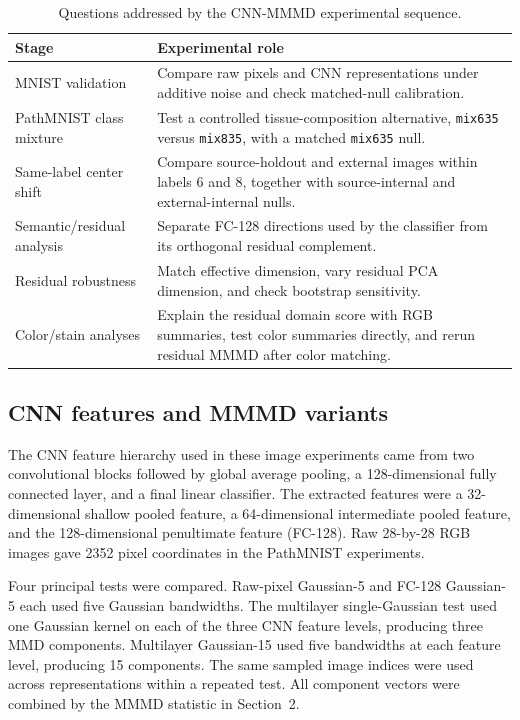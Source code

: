 \documentclass[12pt]{article}
\begin{document}
\begin{table}[H]
\centering
\caption{Questions addressed by the CNN-MMMD experimental sequence.}
\label{tab:app-dechao-ledger}
\footnotesize
\renewcommand{\arraystretch}{0.92}
\setlength{\tabcolsep}{3pt}
\begin{tabular}{>{\raggedright\arraybackslash}p{}>{\raggedright\arraybackslash}p{}}
\toprule
Stage & Experimental role \\
\midrule
MNIST validation & Compare raw pixels and CNN representations under additive noise and check matched-null calibration. \\
PathMNIST class mixture & Test a controlled tissue-composition alternative, \texttt{mix635} versus \texttt{mix835}, with a matched \texttt{mix635} null. \\
Same-label center shift & Compare source-holdout and external images within labels 6 and 8, together with source-internal and external-internal nulls. \\
Semantic/residual analysis & Separate FC-128 directions used by the classifier from its orthogonal residual complement. \\
Residual robustness & Match effective dimension, vary residual PCA dimension, and check bootstrap sensitivity. \\
Color/stain analyses & Explain the residual domain score with RGB summaries, test color summaries directly, and rerun residual MMMD after color matching. \\
\bottomrule
\end{tabular}
\end{table}

\subsection{CNN features and MMMD variants}

The CNN feature hierarchy used in these image experiments came from two convolutional blocks followed by global average pooling, a 128-dimensional fully connected layer, and a final linear classifier. The extracted features were a 32-dimensional shallow pooled feature, a 64-dimensional intermediate pooled feature, and the 128-dimensional penultimate feature (FC-128). Raw 28-by-28 RGB images gave 2352 pixel coordinates in the PathMNIST experiments.

Four principal tests were compared. Raw-pixel Gaussian-5 and FC-128 Gaussian-5 each used five Gaussian bandwidths. The multilayer single-Gaussian test used one Gaussian kernel on each of the three CNN feature levels, producing three MMD components. Multilayer Gaussian-15 used five bandwidths at each feature level, producing 15 components. The same sampled image indices were used across representations within a repeated test. All component vectors were combined by the MMMD statistic in Section~2.
\end{document}
